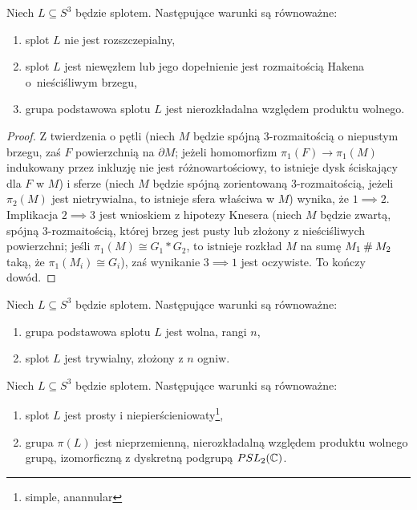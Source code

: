 \begin{proposition}
    Niech $L \subseteq S^3$ będzie splotem.
    Następujące warunki są równoważne:
    \begin{enumerate}
        \item splot $L$ nie jest rozszczepialny,
%
        \item splot $L$ jest niewęzłem lub jego dopełnienie jest rozmaitością Hakena o~nieściśliwym brzegu,
%
        \item grupa podstawowa splotu $L$ jest nierozkładalna względem produktu wolnego.
    \end{enumerate}
\end{proposition}

\begin{proof}
    Z twierdzenia o pętli (niech $M$ będzie spójną 3-rozmaitością o niepustym brzegu, zaś $F$ powierzchnią na $\partial M$; jeżeli homomorfizm $\pi_1(F) \to \pi_1(M)$ indukowany przez inkluzję nie jest różnowartościowy, to istnieje dysk ściskający dla $F$ w $M$) i sferze (niech $M$ będzie spójną zorientowaną 3-rozmaitością, jeżeli $\pi_2(M)$ jest nietrywialna, to istnieje sfera właściwa w $M$) wynika, że $1 \implies 2$.
    Implikacja $2 \implies 3$ jest wnioskiem z hipotezy Knesera (niech $M$ będzie zwartą, spójną 3-rozmaitością, której brzeg jest pusty lub złożony z nieściśliwych powierzchni; jeśli $\pi_1(M) \cong G_1 * G_2$, to istnieje rozkład $M$ na sumę $M_1 \mathbin{\#} M_2$ taką, że $\pi_1(M_i) \cong G_i$), zaś wynikanie $3 \implies 1$ jest oczywiste.
    To kończy dowód.
\end{proof}

\begin{corollary}
    Niech $L \subseteq S^3$ będzie splotem.
    Następujące warunki są równoważne:
    \begin{enumerate}
        \item grupa podstawowa splotu $L$ jest wolna, rangi $n$,
        \item splot $L$ jest trywialny, złożony z $n$ ogniw.
    \end{enumerate}
\end{corollary}

\begin{proposition}
    Niech $L \subseteq S^3$ będzie splotem.
    Następujące warunki są równoważne:
    \begin{enumerate}
        \item splot $L$ jest prosty i niepierścieniowaty\footnote{simple, anannular},
        \item grupa $\pi(L)$ jest nieprzemienną, nierozkładalną względem produktu wolnego grupą, izomorficzną z dyskretną podgrupą $PSL_2(\mathbb C)$.
    \end{enumerate}
\end{proposition}

